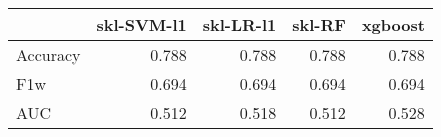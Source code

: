 \begin{tabular}{lrrrr}
\toprule
{} &  skl-SVM-l1 &  skl-LR-l1 &  skl-RF &  xgboost \\
\midrule
Accuracy &       0.788 &      0.788 &   0.788 &    0.788 \\
F1w      &       0.694 &      0.694 &   0.694 &    0.694 \\
AUC      &       0.512 &      0.518 &   0.512 &    0.528 \\
\bottomrule
\end{tabular}
